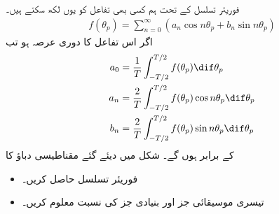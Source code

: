 فوریئر تسلسل کے تحت ہم کسی بھی تفاعل   کو یوں لکھ سکتے ہیں۔
\begin{align}
f(\theta_p)=\sum_{n=0}^{\infty} (a_n \cos n \theta_p +b_n \sin n \theta_p)
\end{align}
اگر اس تفاعل کا دوری عرصہ  ہو تب
\begin{gather}
\begin{aligned}
a_0&=\frac{1}{T} \int_{-T/2}^{T/2} f(\theta_p) \dif \theta_p\\
a_n&=\frac{2}{T} \int_{-T/2}^{T/2} f(\theta_p) \cos n \theta_p \dif \theta_p\\
b_n&=\frac{2}{T} \int_{-T/2}^{T/2} f(\theta_p) \sin n \theta_p \dif \theta_p
\end{aligned}
\end{gather}
کے برابر ہوں گے۔
%
شکل  میں دیئے گئے مقناطیسی دباؤ کا
\begin{itemize}
\item
فوریئر تسلسل حاصل کریں۔
\item
تیسری موسیقائی جز اور بنیادی جز کی نسبت معلوم کریں۔
\end{itemize}

